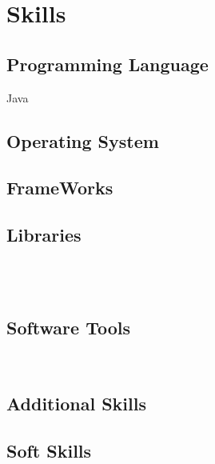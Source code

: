 \documentclass[letterpaper]{deedy-resume}
\begin{document}
\begin{minipage}[t]{0.30\textwidth} 


%
%

\section{Skills}

\subsection{Programming Language}
\textbullet{} Java
\sectionspace
\subsection{Operating System}
\sectionspace
\subsection{FrameWorks}
 
\sectionspace
\subsection{Libraries}
   \\
  \\
\sectionspace
\subsection{Software Tools}
  
 \\  
\sectionspace
\subsection{Additional Skills}
  
\sectionspace
\subsection{Soft Skills}
 
\sectionspace

%
%               
%


\end{minipage}
\end{document}

